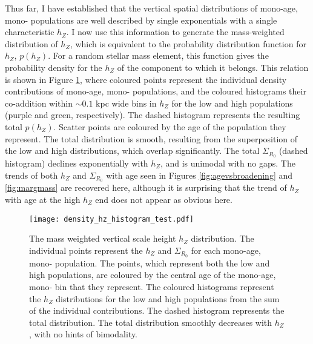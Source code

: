 Thus far, I have established that the vertical spatial distributions of mono-age, mono-\feh{} populations are well described by single exponentials with a single characteristic $h_Z$. I now use this information to generate the mass-weighted distribution of $h_Z$, which is equivalent to the probability distribution function for $h_Z$, $p(h_Z)$. For a random stellar mass element, this function gives the probability density for the $h_Z$ of the component to which it belongs.  This relation is shown in Figure \ref{fig:hzhistogram}, where coloured points represent the individual density contributions of mono-age, mono-\feh{} populations, and the coloured histograms their co-addition within $\sim 0.1$ kpc wide bins in $h_Z$ for the low and high \afe{} populations (purple and green, respectively). The dashed histogram represents the resulting total $p(h_Z)$. Scatter points are coloured by the age of the population they represent. The total distribution is smooth, resulting from the superposition of the low and high \afe{} distributions, which overlap significantly.  The total $\Sigma_{R_0}$ (dashed histogram) declines exponentially with $h_Z$, and is unimodal with no gaps. The trends of both $h_Z$ and $\Sigma_{R_0}$ with age seen in Figures \ref{fig:agevsbroadening} and \ref{fig:margmass} are recovered here, although it is surprising that the trend of $h_Z$ with age at the high $h_Z$ end does not appear as obvious here.

 \begin{figure}
	\texttt{[image: density\_hz\_histogram\_test.pdf]}
 	\centering
     \caption[The mass weighted vertical scale height distribution as calculated using mono-age, mono-\feh{} populations in APOGEE DR12]{The mass weighted vertical scale height $h_Z$ distribution. The individual points represent the $h_Z$ and $\Sigma_{R_0}$ for each mono-age, mono-\feh{} population. The points, which represent both the low and high \afe{} populations, are coloured by the central age of the mono-age, mono-\feh{} bin that they represent. The coloured histograms represent the $h_Z$ distributions for the low and high \afe{} populations from the sum of the individual contributions. The dashed histogram represents the total distribution. The total distribution smoothly decreases with $h_Z$, with no hints of bimodality.}
     \label{fig:hzhistogram}
 \end{figure}

